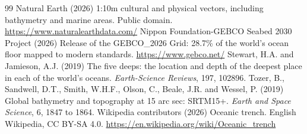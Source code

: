 \documentclass[11pt,a4paper]{article}
\begin{document}
\begin{thebibliography}{99}
 Natural Earth (2026) 1:10m cultural and physical vectors, including bathymetry and marine areas. Public domain. \url{https://www.naturalearthdata.com/}
 Nippon Foundation-GEBCO Seabed 2030 Project (2026) Release of the GEBCO\_2026 Grid: 28.7\% of the world's ocean floor mapped to modern standards. \url{https://www.gebco.net/}
 Stewart, H.A. and Jamieson, A.J. (2019) The five deeps: the location and depth of the deepest place in each of the world's oceans. \emph{Earth-Science Reviews}, 197, 102896.
 Tozer, B., Sandwell, D.T., Smith, W.H.F., Olson, C., Beale, J.R. and Wessel, P. (2019) Global bathymetry and topography at 15 arc sec: SRTM15+. \emph{Earth and Space Science}, 6, 1847 to 1864.
 Wikipedia contributors (2026) Oceanic trench. English Wikipedia, CC BY-SA 4.0. \url{https://en.wikipedia.org/wiki/Oceanic_trench}
\end{thebibliography}
\end{document}
